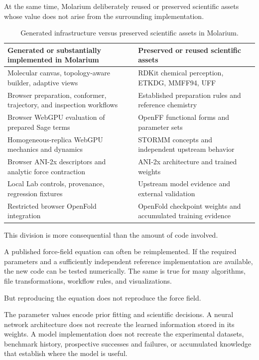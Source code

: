\documentclass[11pt]{article}
\begin{document}
At the same time, Molarium deliberately reused or preserved scientific assets whose value does not arise from the surrounding implementation.

\begin{table}[htbp]
\centering
\caption{Generated infrastructure versus preserved scientific assets in Molarium.}
\label{tab:generated-preserved}
\small
\begin{tabularx}{\linewidth}{>{\raggedright\arraybackslash}X >{\raggedright\arraybackslash}X}
\toprule
\textbf{Generated or substantially implemented in Molarium} & \textbf{Preserved or reused scientific assets} \\
\midrule
Molecular canvas, topology-aware builder, adaptive views & RDKit chemical perception, ETKDG, MMFF94, UFF \\
Browser preparation, conformer, trajectory, and inspection workflows & Established preparation rules and reference chemistry \\
Browser WebGPU evaluation of prepared Sage terms & OpenFF functional forms and parameter sets \\
Homogeneous-replica WebGPU mechanics and dynamics & STORMM concepts and independent upstream behavior \\
Browser ANI-2x descriptors and analytic force contraction & ANI-2x architecture and trained weights \\
Local Lab controls, provenance, regression fixtures & Upstream model evidence and external validation \\
Restricted browser OpenFold integration & OpenFold checkpoint weights and accumulated training evidence \\
\bottomrule
\end{tabularx}
\end{table}

This division is more consequential than the amount of code involved.

A published force-field equation can often be reimplemented. If the required parameters and a sufficiently independent reference implementation are available, the new code can be tested numerically. The same is true for many algorithms, file transformations, workflow rules, and visualizations.

But reproducing the equation does not reproduce the force field.

The parameter values encode prior fitting and scientific decisions. A neural network architecture does not recreate the learned information stored in its weights. A model implementation does not recreate the experimental datasets, benchmark history, prospective successes and failures, or accumulated knowledge that establish where the model is useful.
\end{document}
